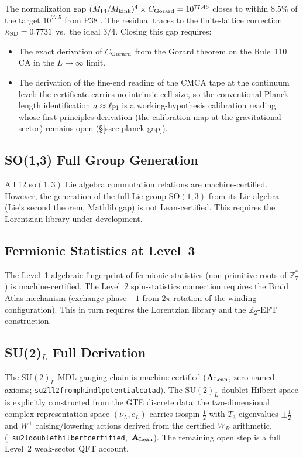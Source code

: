 \documentclass[11pt]{article}
\theoremstyle{remark}
\newcommand{\ZS}{\mathbb{Z}_7}
\newcommand{\ZZ}{\mathbb{Z}}
\newcommand{\lean}[1]{%
  \penalty-100
  \begingroup\def\_{\textunderscore\allowbreak}\texttt{#1}\endgroup}
\newcommand{\Mkink}{M_{\rm kink}}
\newcommand{\CatAL}{\ensuremath{\textbf{A}_{\rm Lean}}}
\newcommand{\CMCA}{\text{CMCA}}
\begin{document}
The normalization gap $(M_{\rm Pl}/\Mkink)^4 \times C_{\rm Gorard} =
10^{77.46}$ closes to within $8.5\%$ of the target $10^{77.5}$ from P38
\cite{SpivackPhiMDLGravity}. The residual traces to the finite-lattice
correction $\kappa_{\rm SD} = 0.7731$ vs.\ the ideal $3/4$. Closing this
gap requires:
\begin{itemize}
  \item The exact derivation of $C_{\rm Gorard}$ from the Gorard theorem
        on the Rule~110 CA in the $L \to \infty$ limit.
  \item The derivation of the fine-end reading of the $\CMCA$ tape at the
        continuum level: the certificate carries no intrinsic cell size, so
        the conventional Planck-length identification $a \approx \ell_{\rm Pl}$
        is a working-hypothesis calibration reading whose first-principles
        derivation (the calibration map at the gravitational sector) remains
        open (\S\ref{ssec:planck-gap}).
\end{itemize}

\subsection{SO(1,3) Full Group Generation}

All 12 so$(1,3)$ Lie algebra commutation relations are machine-certified.
However, the generation of the full Lie group SO$(1,3)$ from its Lie algebra
(Lie's second theorem, Mathlib gap) is not Lean-certified. This requires
the Lorentzian library under development.

\subsection{Fermionic Statistics at Level~3}

The Level~1 algebraic fingerprint of fermionic statistics (non-primitive
roots of $\ZS^*$) is machine-certified. The Level~2 spin-statistics
connection requires the Braid Atlas mechanism (exchange phase $-1$ from
$2\pi$ rotation of the winding configuration). This in turn requires the
Lorentzian library and the $\ZZ_2$-EFT construction.

\subsection{SU(2)\texorpdfstring{$_L$}{L} Full Derivation}

The SU$(2)_L$ MDL gauging chain is machine-certified ($\CatAL$, zero named axioms;
\lean{su2l\_l2\_from\_phimdl\_potential\_catad}).
The $\mathrm{SU}(2)_L$ doublet Hilbert space is explicitly constructed from the GTE
discrete data: the two-dimensional complex representation space $(\nu_L, e_L)$
carries isospin-$\tfrac{1}{2}$ with $T_3$ eigenvalues $\pm\tfrac{1}{2}$ and $W^\pm$
raising/lowering actions derived from the certified $W_B$ arithmetic.
\mbox{(\lean{su2l\_doublet\_hilbert\_certified}, \CatAL)}.
The remaining open step is a full Level~2 weak-sector QFT account.
\end{document}
